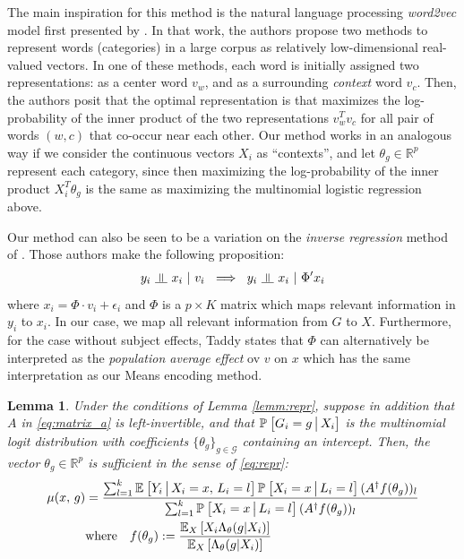 \documentclass{article}
\newcommand{\indep}{\rotatebox[origin=c]{90}{$\models$}}
\theoremstyle{plain}
\newtheorem{lemm}[prop]{Lemma}
\theoremstyle{definition}
\theoremstyle{remark}
\begin{document}
The main inspiration for this method is the natural language processing \emph{word2vec} model first presented by \cite{mikolov2013efficient}. In that work, the authors propose two methods to represent words (categories) in a large corpus as relatively low-dimensional real-valued vectors. In one of these methods, each word is initially assigned two representations: as a center word $v_{w}$, and as a surrounding \emph{context} word $v_{c}$. Then, the authors posit that the optimal representation is that maximizes the log-probability of the inner product of the two representations $v_{w}^{T}v_{c}$ for all pair of words $(w, c)$ that co-occur near each other. Our method works in an analogous way if we consider the continuous vectors $X_{i}$ as ``contexts'', and let $\theta_{g} \in \mathbb{R}^{p}$ represent each category, since then maximizing the log-probability of the inner product $X_{i}^{T}\theta_{g}$ is the same as maximizing the multinomial logistic regression above.


{\color{red} Our method can also be seen to be a variation on the \emph{inverse regression} method of \cite{taddy2014heterogeneous}. Those authors make the following proposition:
\begin{align*}
    y_i\ \indep\ x_i\ |\ v_i\ \implies\ y_i\ \indep\ x_i\ |\ \Phi'x_i
\end{align*}
where $x_i = \Phi \cdot v_i + \epsilon_i$ and $\Phi$ is a $p \times K$ matrix which maps relevant information in $y_i$ to $x_i$. In our case, we map all relevant information from $G$ to $X$. Furthermore, for the case without subject effects, Taddy states that $\Phi$ can alternatively be interpreted as the \textit{population average effect} ov $v$ on $x$ which has the same interpretation as our Means encoding method. }



\begin{lemm}
\label{lemm:mnl}
Under the conditions of Lemma \ref{lemm:repr}, suppose in addition that $A$ in \eqref{eq:matrix_a} is left-invertible, and that $\PP{ G_{i}=g \cond X_{i}}$ is the multinomial logit distribution with coefficients $\{\theta_{g} \}_{g \in \mathcal{G}}$ containing an intercept. Then, the vector $\theta_{g} \in \mathbb{R}^{p}$ is sufficient in the sense of \eqref{eq:repr}:
\begin{align}
\mu(x, \, g) &= \frac{\sum_{l = 1}^k  \EE{Y_i \cond X_i = x, \, L_i = l} \PP{X_i = x \cond L_i = l} (A^\dagger f(\theta_g))_l}
                     {\sum_{l = 1}^k \PP{X_i = x \cond L_i = l} (A^\dagger f(\theta_{g}))_{l} } \\
&\text{where} \quad f(\theta_{g}) := \frac{\EE[X]{ X_{i}\Lambda_{\theta}(g|X_{i})}}{\EE[X]{\Lambda_{\theta}(g|X_{i})}}
\end{align}
\end{lemm}
\end{document}
